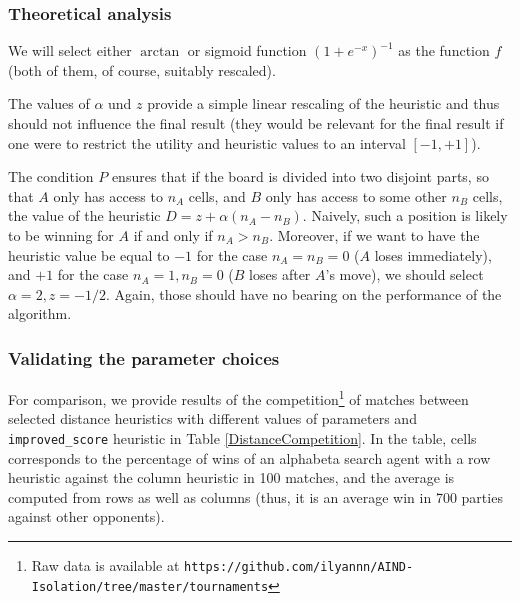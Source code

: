 \documentclass[oneside]{article}   	%
\begin{document}
\subsubsection{Theoretical analysis}
\label{DistanceAnalysis}

We will select either $\arctan$ or sigmoid function $(1+e^{-x})^{-1}$ as the function $f$ (both of them, of course, suitably rescaled). 

The values of $\alpha$ und $z$ provide a simple linear rescaling of the heuristic and thus should not influence the final result (they would be relevant for the final result if one were to restrict the utility and heuristic values to an interval $[-1, +1]$).

The condition $P$ ensures that if the board is divided into two disjoint parts, so that $A$ only has access to $n_A$ cells, and $B$ only has access to some other $n_B$ cells, the value of the heuristic $D = z+\alpha(n_A-n_B)$. Naively, such a position is likely to be winning for $A$ if and only if $n_A > n_B$. Moreover, if we want to have the heuristic value be equal to $-1$ for the case $n_A=n_B=0$ ($A$ loses immediately), and $+1$ for the case $n_A=1, n_B=0$ ($B$ loses after $A$'s move), we should select $\alpha = 2, z = -1/2$. Again, those should have no bearing on the performance of the algorithm.


\subsubsection{Validating the parameter choices}
\label{distancechoices}

For comparison, we provide results of the competition\footnote{Raw data is available at \texttt{https://github.com/ilyannn/AIND-Isolation/tree/master/tournaments}} of matches between selected distance heuristics with different values of parameters and \texttt{improved\_score} heuristic in Table \ref{DistanceCompetition}. In the table, cells corresponds to the percentage of wins of an alphabeta search agent with a row heuristic against the column heuristic in 100 matches, and the average is computed from rows as well as columns (thus, it is an average win in 700 parties against other opponents).
\end{document}
